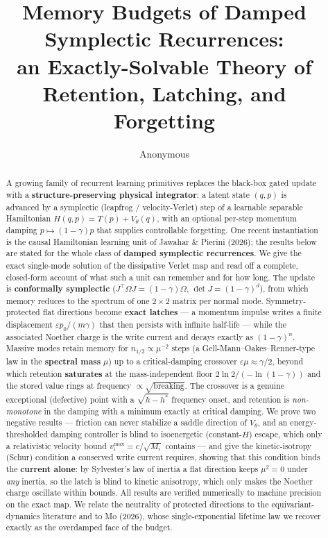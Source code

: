 \documentclass[11pt]{article}
\title{\textbf{Memory Budgets of Damped Symplectic Recurrences:\\
an Exactly-Solvable Theory of Retention, Latching, and Forgetting}}
\author{Anonymous}
\date{}
\theoremstyle{plain}
\theoremstyle{definition}
\newcommand{\Om}{\Omega}
\begin{document}
\sloppy
\maketitle

\begin{abstract}
A growing family of recurrent learning primitives replaces the black-box gated update with a \textbf{structure-preserving physical integrator}: a latent state $(q,p)$ is advanced by a symplectic (leapfrog / velocity-Verlet) step of a learnable separable Hamiltonian $H(q,p)=T(p)+V_\theta(q)$, with an optional per-step momentum damping $p\mapsto(1-\gamma)p$ that supplies controllable forgetting. One recent instantiation is the causal Hamiltonian learning unit of Jawahar \& Pierini (2026); the results below are stated for the whole class of \textbf{damped symplectic recurrences}. We give the exact single-mode solution of the dissipative Verlet map and read off a complete, closed-form account of what such a unit can remember and for how long. The update is \textbf{conformally symplectic} ($J^\top\Om J=(1-\gamma)\Om$, $\det J=(1-\gamma)^d$), from which memory reduces to the spectrum of one $2\times2$ matrix per normal mode. Symmetry-protected flat directions become \textbf{exact latches} --- a momentum impulse writes a finite displacement $\varepsilon p_0/(m\gamma)$ that then persists with infinite half-life --- while the associated Noether charge is the write current and decays exactly as $(1-\gamma)^n$. Massive modes retain memory for $n_{1/2}\propto\mu^{-2}$ steps (a Gell-Mann--Oakes--Renner-type law in the \textbf{spectral mass} $\mu$) up to a critical-damping crossover $\varepsilon\mu\approx\gamma/2$, beyond which retention \textbf{saturates} at the mass-independent floor $2\ln2/(-\ln(1-\gamma))$ and the stored value rings at frequency $\propto\sqrt{\text{breaking}}$. The crossover is a genuine exceptional (defective) point with a $\sqrt{h-h^*}$ frequency onset, and retention is \emph{non-monotone} in the damping with a minimum exactly at critical damping. We prove two negative results --- friction can never stabilize a saddle direction of $V_\theta$, and an energy-thresholded damping controller is blind to isoenergetic (constant-$H$) escape, which only a relativistic velocity bound $v_i^{\max}=c/\sqrt{M_i}$ contains --- and give the kinetic-isotropy (Schur) condition a conserved write current requires, showing that this condition binds the \textbf{current alone}: by Sylvester's law of inertia a flat direction keeps $\mu^2=0$ under \emph{any} inertia, so the latch is blind to kinetic anisotropy, which only makes the Noether charge oscillate within bounds. All results are verified numerically to machine precision on the exact map. We relate the neutrality of protected directions to the equivariant-dynamics literature and to Mo (2026), whose single-exponential lifetime law we recover exactly as the overdamped face of the budget.
\end{abstract}
\end{document}
